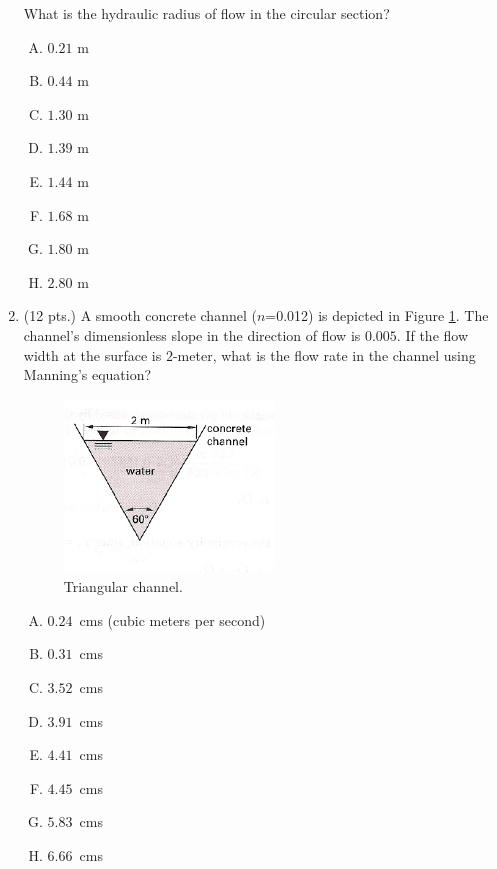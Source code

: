 \documentclass[11pt]{article}
\begin{document}
\begin{enumerate}
What is the hydraulic radius of flow in the circular section?
\begin{enumerate} [(A)]
\item $0.21$ m
\item $0.44$ m
\item $1.30$ m
\item $1.39$ m
\item $1.44$ m
\item $1.68$ m
\item $1.80$ m
\item $2.80$ m
\end{enumerate}
\clearpage
\item (12 pts.)
A smooth concrete channel ($n$=0.012) is depicted in Figure \ref{fig:TriangleChannel}.  
The channel's dimensionless slope in the direction of flow is $0.005$.  
If the flow width at the surface is $2$-meter, what is the flow rate in the channel using Manning's equation?

\begin{figure}[h!] %
\centering
   \includegraphics[width=2.2in]{TriangleChannel.jpg}
   \caption{Triangular channel.}
   \label{fig:TriangleChannel} 
\end{figure}

\begin{enumerate} [(A)]
\item $0.24$~cms (cubic meters per second)
\item $0.31$~cms 
\item $3.52$~cms 
\item $3.91$~cms 
\item $4.41$~cms 
\item $4.45$~cms 
\item $5.83$~cms 
\item $6.66$~cms 
\end{enumerate}


\end{enumerate}
\end{document}

